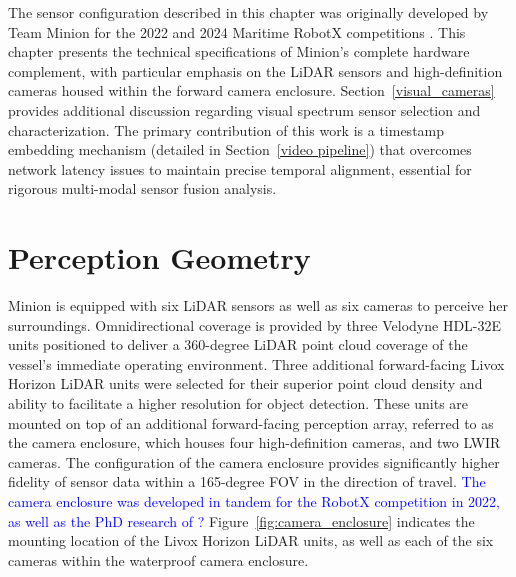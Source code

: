 \documentclass{erauthesis}
\begin{document}
The sensor configuration described in this chapter was originally developed by Team Minion for the 2022 and 2024 Maritime RobotX competitions \cite{holland2024, thompson2023}. This chapter presents the technical specifications of Minion's complete hardware complement, with particular emphasis on the \ac{LiDAR} sensors and high-definition cameras housed within the forward camera enclosure. Section~\ref{visual_cameras} provides additional discussion regarding visual spectrum sensor selection and characterization. The primary contribution of this work is a timestamp embedding mechanism (detailed in Section~\ref{video pipeline}) that overcomes network latency issues to maintain precise temporal alignment, essential for rigorous multi-modal sensor fusion analysis.

\section{Perception Geometry} \label{perception_geometry}

Minion is equipped with six \ac{LiDAR} sensors as well as six cameras to perceive her surroundings.
Omnidirectional coverage is provided by three Velodyne HDL-32E units positioned to deliver a 360-degree \ac{LiDAR} point cloud coverage of the vessel's immediate operating environment.
Three additional forward-facing Livox Horizon \ac{LiDAR} units were selected for their superior point cloud density and ability to facilitate a higher resolution for object detection.
These units are mounted on top of an additional forward-facing perception array, referred to as the camera enclosure, which houses four high-definition cameras, and two \ac{LWIR} cameras.
The configuration of the camera enclosure provides significantly higher fidelity of sensor data within a 165-degree \ac{FOV} in the direction of travel.
\textcolor{blue}{The camera enclosure was developed in tandem for the RobotX competition in 2022, as well as the PhD research of \cite{thompson2023}?}
Figure~\ref{fig:camera_enclosure} indicates the mounting location of the Livox Horizon LiDAR units, as well as each of the six cameras within the waterproof camera enclosure. 
\end{document}
